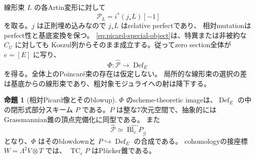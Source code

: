 \documentclass[a4paper,11pt]{ltjsarticle}
\theoremstyle{definition}
\newtheorem{theorem}{命題}[section]
\newcommand{\Def}{\operatorname{Def}}
\begin{document}
線形束 $L$ の各Artin変形に対して
\[
 \mathcal P_L=i^*(j_*L)[-1]
\]
を取る。$j$ は正則埋め込みなので $j_*L$ はrelative perfectであり、
相対mutationはperfect性と基底変換を保つ。
\eqref{eq:picard-special-object}は、特異または非被約な $C_U$ に対しても
Koszul列からそのまま成立する。従ってzero section全体が $e=[E]$ に写り、
\[
 \Phi:\widehat{\mathcal P}\longrightarrow\Def_E
\]
を得る。全体上のPoincar\'e束の存在は仮定しない。
局所的な線形束の選択の差は基底からの線形束であり、粗対象モジュライへの射は降下する。

\begin{theorem}[相対Picard像とそのblowup]\label{thm:picard-formal-image}
$\Phi$ のscheme-theoretic imageは、$\Def_E$ の中の閉形式部分スキーム
$P$ である。$P$ は整な7次元空間で、抽象的にはGrassmannian錐の頂点完備化に同型である。
また
\[
 \widehat{\mathcal P}\simeq
 \widehat{\operatorname{Bl}_eP}_{\mathcal G}
\]
となり、$\Phi$ はそのblowdownと $P\hookrightarrow\Def_E$ の合成である。
cohomologyの接座標 $W=\Lambda^2V\otimes T$ では、
$\operatorname{TC}_eP$ はPl\"ucker錐である。
\end{theorem}
\end{document}

